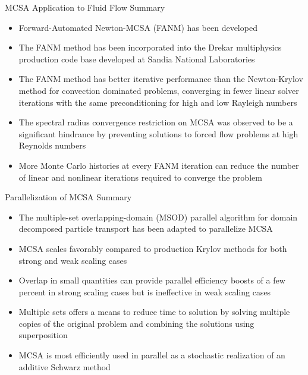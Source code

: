 \documentclass{beamer}
\begin{document}
\begin{frame}{MCSA Application to Fluid Flow Summary}

  \small{
    \begin{itemize}
    \item Forward-Automated Newton-MCSA (FANM) has been developed
      \medskip
    \item The FANM method has been incorporated into the Drekar
      multiphysics production code base developed at Sandia National
      Laboratories
      \medskip
    \item The FANM method has better iterative performance than the
      Newton-Krylov method for convection dominated problems, converging
      in fewer linear solver iterations with the same preconditioning for
      high and low Rayleigh numbers
      \medskip
    \item The spectral radius convergence restriction on MCSA was observed
      to be a significant hindrance by preventing solutions to forced flow
      problems at high Reynolds numbers
      \medskip
    \item More Monte Carlo histories at every FANM iteration can reduce
      the number of linear and nonlinear iterations required to converge
      the problem
    \end{itemize}
  }

\end{frame}

\begin{frame}{Parallelization of MCSA Summary}

  \small{
    \begin{itemize}
    \item The multiple-set overlapping-domain (MSOD) parallel
      algorithm for domain decomposed particle transport has been
      adapted to parallelize MCSA
      \medskip
    \item MCSA scales favorably compared to production Krylov methods for
      both strong and weak scaling cases
      \medskip
    \item Overlap in small quantities can provide parallel efficiency
      boosts of a few percent in strong scaling cases but is
      ineffective in weak scaling cases
      \medskip
    \item Multiple sets offers a means to reduce time to solution by
      solving multiple copies of the original problem and combining the
      solutions using superposition
      \medskip
    \item MCSA is most efficiently used in parallel as a stochastic
      realization of an additive Schwarz method
    \end{itemize}
  }

\end{frame}
\end{document}
